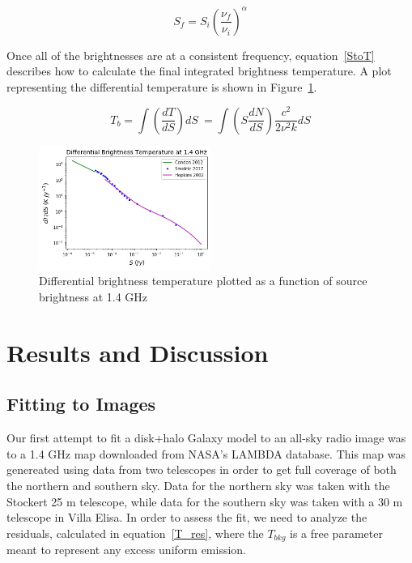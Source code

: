 \documentclass[%
onecolumn,
11pt,
tightenlines,
notitlepage,
superscriptaddress,
nofootinbib,
amsmath,amssymb,
aps,
pra,
]{revtex4-1}
\begin{document}
\begin{equation}
S_{f} = S_{i} \left(\frac{\nu_{f}}{\nu_{i}}\right)^{\alpha}
\label{spectralindex}
\end{equation}

Once all of the brightnesses are at a consistent frequency, equation~\ref{StoT} describes how to calculate the final integrated brightness temperature. A plot representing the differential temperature is shown in Figure~\ref{Tb}.

\begin{equation}
T_{b} = \int \left(\frac{dT}{dS}\right) dS \ = \int \left(S\frac{dN}{dS}\right) \frac{c^{2}}{2\nu^{2}k} dS
\label{StoT}
\end{equation}

\begin{figure}[h]
\begin{center}
\includegraphics[width=0.5\textwidth]{T_b.jpg}
\caption{Differential brightness temperature plotted as a function of source brightness at 1.4 GHz}
\label{Tb}
\end{center}
\end{figure}


\section{Results and Discussion}

\subsection{Fitting to Images}
Our first attempt to fit a disk+halo Galaxy model to an all-sky radio image was to a 1.4 GHz map \citep{Reich1986} downloaded from NASA's LAMBDA database. This map was genereated using data from two telescopes in order to get full coverage of both the northern and southern sky. Data for the northern sky was taken with the Stockert 25 m telescope, while data for the southern sky was taken with a 30 m telescope in Villa Elisa. In order to assess the fit, we need to analyze the residuals, calculated in equation~\ref{T_res}, where the $T_{bkg}$ is a free parameter meant to represent any excess uniform emission. 
\end{document}
